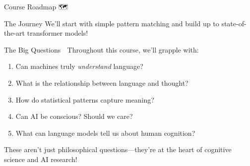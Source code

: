 \documentclass[aspectratio=169]{beamer}
\begin{document}
\begin{frame}[shrink=5]{Course Roadmap 🗺️}
\begin{center}
\end{center}

\vspace{0.3cm}

\begin{alertblock}{The Journey}
We'll start with simple pattern matching and build up to state-of-the-art transformer models!
\end{alertblock}
\end{frame}

\begin{frame}[shrink=5]{The Big Questions 🌟}
\small
Throughout this course, we'll grapple with:

\begin{enumerate}\setlength{\itemsep}{0pt}
    \item Can machines truly \textit{understand} language?
    \item What is the relationship between language and thought?
    \item How do statistical patterns capture meaning?
    \item Can AI be conscious? Should we care?
    \item What can language models tell us about human cognition?
\end{enumerate}

\vspace{0.3cm}

\begin{thinkaboutit}
These aren't just philosophical questions—they're at the heart of cognitive science and AI research!
\end{thinkaboutit}
\end{frame}
\end{document}
